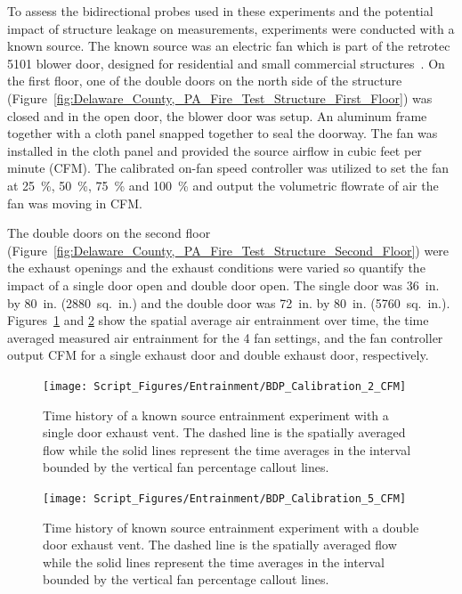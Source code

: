 \documentclass[12pt,oneside]{book}
\begin{document}
To assess the bidirectional probes used in these experiments and the potential impact of structure leakage on measurements, experiments were conducted with a known source. The known source was an electric fan which is part of the retrotec 5101 blower door, designed for residential and small commercial structures~\cite{RetroTecManual}. On the first floor, one of the double doors on the north side of the structure (Figure~\ref{fig:Delaware_County,_PA_Fire_Test_Structure_First_Floor}) was closed and in the open door, the blower door was setup. An aluminum frame together with a cloth panel snapped together to seal the doorway. The fan was installed in the cloth panel and provided the source airflow in cubic feet per minute (CFM). The calibrated on-fan speed controller was utilized to set the fan at 25~\%, 50~\%, 75~\% and 100~\% and output the volumetric flowrate of air the fan was moving in CFM. 

The double doors on the second floor (Figure~\ref{fig:Delaware_County,_PA_Fire_Test_Structure_Second_Floor}) were the exhaust openings and the exhaust conditions were varied so quantify the impact of a single door open and double door open. The single door was 36~in. by 80~in. (2880~sq.~in.) and the double door was 72~in. by 80~in. (5760~sq.~in.). Figures~\ref{fig:known_single_door} and \ref{fig:known_double_door} show the spatial average air entrainment over time, the time averaged measured air entrainment for the 4 fan settings, and the fan controller output CFM for a single exhaust door and double exhaust door, respectively. 


\begin{figure}[!ht]
\centering
\texttt{[image: Script\_Figures/Entrainment/BDP\_Calibration\_2\_CFM]} 
\caption[Comparison of Known Source to Measured CFM with Single Door Exhaust]{Time history of a known source entrainment experiment with a single door exhaust vent. The dashed line is the spatially averaged flow while the solid lines represent the time averages in the interval bounded by the vertical fan percentage callout lines.}
\label{fig:known_single_door}
\end{figure}

\begin{figure}[!ht]
\centering
\texttt{[image: Script\_Figures/Entrainment/BDP\_Calibration\_5\_CFM]} 
\caption[Comparison of Known Source to Measured CFM with Double Door Exhaust]{Time history of known source entrainment experiment with a double door exhaust vent. The dashed line is the spatially averaged flow while the solid lines represent the time averages in the interval bounded by the vertical fan percentage callout lines.}
\label{fig:known_double_door}
\end{figure}
\end{document}
